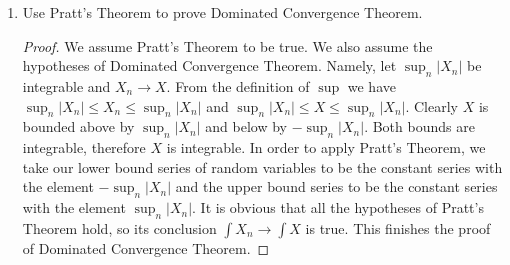 \documentclass[letterpaper,10pt]{article}
\begin{document}
\begin{enumerate}
\item
Use Pratt's Theorem to prove Dominated Convergence Theorem.
\begin{proof}
We assume Pratt's Theorem to be true. We also assume the hypotheses of Dominated Convergence Theorem. 
Namely, let $\sup_n | X_n |$ be integrable and $X_n \rightarrow X$. From the definition of $\sup$ we have $\sup_n | X_n | \leq X_n \leq \sup_n | X_n |$ and $\sup_n | X_n | \leq X \leq \sup_n | X_n |$. 
Clearly $X$ is bounded above by $\sup_n | X_n |$ and below by $-\sup_n | X_n |$. 
Both bounds are integrable, therefore $X$ is integrable. In order to apply Pratt's Theorem, we take our lower bound series of random variables to be the constant series with the element $-\sup_n | X_n |$ and the upper bound series to be the constant series with the element $\sup_n | X_n |$. 
It is obvious that all the hypotheses of Pratt's Theorem hold, so its conclusion $\int X_n \rightarrow \int X$ is true. 
This finishes the proof of Dominated Convergence Theorem.
\end{proof}
\end{enumerate}
\end{document}
